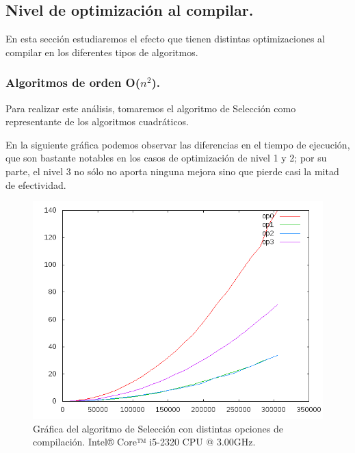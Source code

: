 \documentclass[11pt,a4paper]{article}
\begin{document}
		\subsection{Nivel de optimización al compilar.}

			\par
			En esta sección estudiaremos el efecto que tienen distintas optimizaciones al compilar en los diferentes tipos de algoritmos.

			\subsubsection{Algoritmos de orden O($n^2$).}

				\par
				Para realizar este análisis, tomaremos el algoritmo de Selección como representante de los algoritmos cuadráticos.

				\par
				En la siguiente gráfica podemos observar las diferencias en el tiempo de ejecución, que son bastante notables en los casos de optimización de nivel 1 y 2; por su parte, el nivel 3 no sólo no aporta ninguna mejora sino que pierde casi la mitad de efectividad.

				\begin{figure}[h]

					\centering
					\includegraphics[width=1\textwidth]{seleccion_opt.png}
					\caption{Gráfica del algoritmo de Selección con distintas opciones de compilación. Intel® Core™ i5-2320 CPU @ 3.00GHz.}

				\end{figure}
\end{document}
